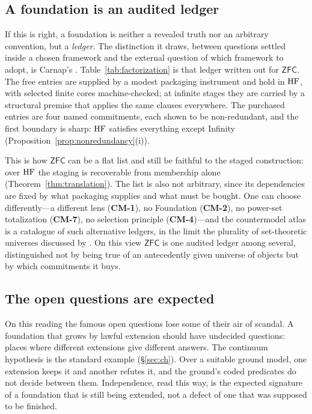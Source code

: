 \subsection{A foundation is an audited ledger}

If this is right, a foundation is neither a revealed truth nor an arbitrary convention, but a
\emph{ledger}. The distinction it draws, between questions settled inside a chosen framework and
the external question of which framework to adopt, is Carnap's \citep{Carnap1950}.
Table~\ref{tab:factorization} is that ledger written out for $\mathsf{ZFC}$. The free entries are
supplied by a modest packaging instrument and hold in $\mathrm{HF}$, with selected finite cores
machine-checked; at infinite stages they are carried by a structural premise that applies the same
clauses everywhere. The purchased entries are four named commitments, each shown to be
non-redundant, and the first boundary is sharp: $\mathrm{HF}$ satisfies everything except Infinity
(Proposition~\ref{prop:nonredundancy}(i)).

This is how $\mathsf{ZFC}$ can be a flat list and still be faithful to the staged construction:
over $\mathrm{HF}$ the staging is recoverable from membership alone (Theorem~\ref{thm:translation}). The
list is also not arbitrary, since its dependencies are fixed by what packaging supplies and what
must be bought. One can choose differently---a different lens (\textbf{CM-1}), no Foundation
(\textbf{CM-2}), no power-set totalization (\textbf{CM-7}), no selection principle
(\textbf{CM-4})---and the countermodel atlas is a catalogue of such alternative ledgers, in the
limit the plurality of set-theoretic universes discussed by \citet{Hamkins2012}. On this view
$\mathsf{ZFC}$ is one audited ledger among several, distinguished not by being true of an
antecedently given universe of objects \citep{Benacerraf1965} but by which commitments it buys.

\subsection{The open questions are expected}

On this reading the famous open questions lose some of their air of scandal. A foundation that
grows by lawful extension should have undecided questions: places where different extensions give
different answers. The continuum hypothesis is the standard example (\S\ref{sec:ch}). Over a
suitable ground model, one extension keeps it and another refutes it, and the ground's coded
predicates do not decide between them. Independence, read this way, is the expected signature of a
foundation that is still being extended, not a defect of one that was supposed to be finished.

